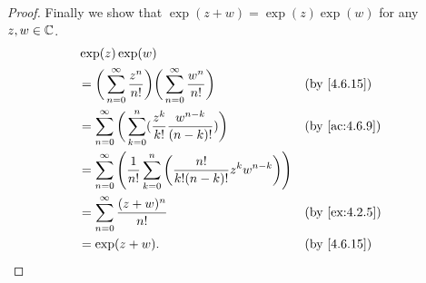 \begin{proof}
  Finally we show that \(\exp(z + w) = \exp(z) \exp(w)\) for any \(z, w \in \mathbb{C}\).
  \begin{align*}
     & \exp(z) \exp(w)                                                                                                                                   \\
     & = \bigg(\sum_{n = 0}^\infty \dfrac{z^n}{n!}\bigg) \bigg(\sum_{n = 0}^\infty \dfrac{w^n}{n!}\bigg)                &  & \text{(by \cref{4.6.15})}   \\
     & = \sum_{n = 0}^\infty \bigg(\sum_{k = 0}^n (\dfrac{z^k}{k!} \dfrac{w^{n - k}}{(n - k)!})\bigg)                   &  & \text{(by \cref{ac:4.6.9})} \\
     & = \sum_{n = 0}^\infty \Bigg(\dfrac{1}{n!} \sum_{k = 0}^n \bigg(\dfrac{n!}{k! (n - k)!} z^k w^{n - k}\bigg)\Bigg)                                  \\
     & = \sum_{n = 0}^\infty \dfrac{(z + w)^n}{n!}                                                                      &  & \text{(by \cref{ex:4.2.5})} \\
     & = \exp(z + w).                                                                                                   &  & \text{(by \cref{4.6.15})}
  \end{align*}
\end{proof}